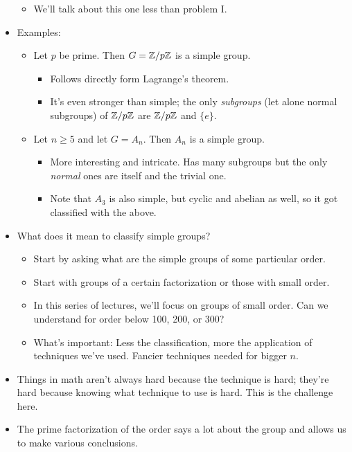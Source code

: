 \documentclass[../notes.tex]{subfiles}
\begin{document}
\begin{itemize}
\begin{itemize}
        \item We'll talk about this one less than problem I.
    \end{itemize}
    \item Examples:
    \begin{itemize}
        \item Let $p$ be prime. Then $G=\mathbb{Z}/p\mathbb{Z}$ is a simple group.
        \begin{itemize}
            \item Follows directly form Lagrange's theorem.
            \item It's even stronger than simple; the only \emph{subgroups} (let alone normal subgroups) of $\mathbb{Z}/p\mathbb{Z}$ are $\mathbb{Z}/p\mathbb{Z}$ and $\{e\}$.
        \end{itemize}
        \item Let $n\geq 5$ and let $G=A_n$. Then $A_n$ is a simple group.
        \begin{itemize}
            \item More interesting and intricate. Has many subgroups but the only \emph{normal} ones are itself and the trivial one.
            \item Note that $A_3$ is also simple, but cyclic and abelian as well, so it got classified with the above.
        \end{itemize}
    \end{itemize}
    \item What does it mean to classify simple groups?
    \begin{itemize}
        \item Start by asking what are the simple groups of some particular order.
        \item Start with groups of a certain factorization or those with small order.
        \item In this series of lectures, we'll focus on groups of small order. Can we understand for order below 100, 200, or 300?
        \item What's important: Less the classification, more the application of techniques we've used. Fancier techniques needed for bigger $n$.
    \end{itemize}
    \item Things in math aren't always hard because the technique is hard; they're hard because knowing what technique to use is hard. This is the challenge here.
    \item The prime factorization of the order says a lot about the group and allows us to make various conclusions.

\end{itemize}
\end{document}
